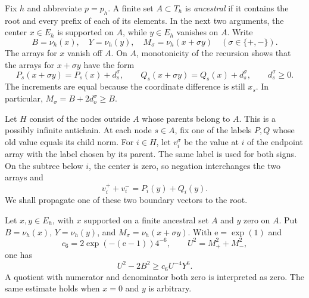 Fix $h$ and abbreviate $p=p_h$.  A finite set $A\subset T_h$ is
\emph{ancestral} if it contains the root and every prefix of each of
its elements.  In the next two arguments, the center $x\in E_h$ is
supported on $A$, while $y\in E_h$ vanishes on $A$.  Write
\[
 B=\nu_h(x),\quad Y=\nu_h(y),\quad
 M_\sigma=\nu_h(x+\sigma y)\quad(\sigma\in\{+,-\}).
\]
The arrays for $x$ vanish off $A$.  On $A$, monotonicity of the
recursion shows that the arrays for $x+\sigma y$ have the form
\begin{equation}\label{var:common-increments}
 P_s(x+\sigma y)=P_s(x)+d_s^\sigma,\qquad
 Q_s(x+\sigma y)=Q_s(x)+d_s^\sigma,
 \qquad d_s^\sigma\ge0.
\end{equation}
The increments are equal because the coordinate difference is still
$x_s$.  In particular, $M_\sigma=B+2d_o^\sigma\ge B$.

Let $H$ consist of the nodes outside $A$ whose parents belong to $A$.
This is a possibly infinite antichain.  At each node $s\in A$, fix
one of the labels $P,Q$ whose old value equals its child norm.
For $i\in H$, let $v_i^\sigma$ be the value at $i$ of the endpoint
array with the label chosen by its parent.  The same label is used
for both signs.  On the subtree below $i$, the center is zero, so
negation interchanges the two arrays and
\begin{equation}\label{var:boundary-signs}
 v_i^++v_i^-=P_i(y)+Q_i(y).
\end{equation}
We shall propagate one of these two boundary vectors to the root.

\begin{lemma}\label{var:sixth-component}
Let $x,y\in E_h$, with $x$ supported on a finite ancestral set $A$
and $y$ zero on $A$.  Put $B=\nu_h(x)$, $Y=\nu_h(y)$, and
$M_\sigma=\nu_h(x+\sigma y)$.  With $\mathrm e=\exp(1)$ and
\[
 c_6=2\exp(-(\mathrm e-1))4^{-6},\qquad
 U^2=M_+^2+M_-^2,
\]
one has
\begin{equation}\label{var:sixth-component-eq}
 U^2-2B^2\ge c_6 U^{-4}Y^6.
\end{equation}
A quotient with numerator and denominator both zero is interpreted
as zero.  The same estimate holds when $x=0$ and $y$ is arbitrary.
\end{lemma}

